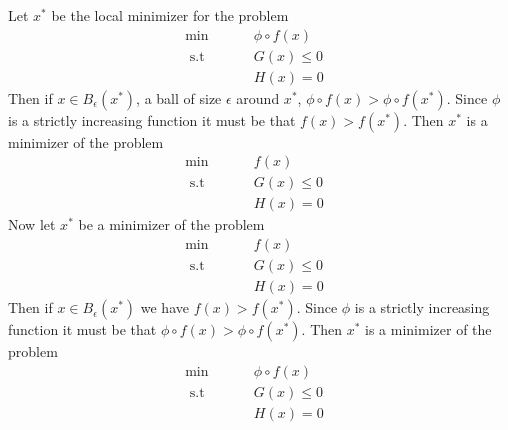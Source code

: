\documentclass[12pt]{article}
\newenvironment{problem}[2][Problem]{\begin{trivlist}
\item[\hskip \labelsep {\bfseries #1}\hskip \labelsep {\bfseries #2}]}{\end{trivlist}}
\begin{document}
\begin{problem}{21.} 
Let $x^*$ be the local minimizer for the problem
\begin{align*}
\min \hspace{1cm} & \phi \circ f(x) &\\
 \text{ s.t } \hspace{1cm}  & G(x) \leq 0& \\
&H(x) = 0&
\end{align*}
Then if $x \in B_\epsilon(x^*)$, a ball of size $\epsilon$ around $x^*$, $ \phi \circ f(x) >  \phi \circ f(x^*)$. Since $\phi$ is a strictly increasing function it must be that $f(x) >  f(x^*)$. Then $x^*$ is a minimizer of the problem
\begin{align*}
\min \hspace{1cm} & f(x) &\\
 \text{ s.t } \hspace{1cm}  & G(x) \leq 0& \\
&H(x) = 0&
\end{align*}
Now let $x^*$ be a minimizer of the problem
\begin{align*}
\min \hspace{1cm} & f(x) &\\
 \text{ s.t } \hspace{1cm}  & G(x) \leq 0& \\
&H(x) = 0&
\end{align*}
Then if $x \in B_\epsilon(x^*)$ we have $ f(x) >  f(x^*)$. Since $\phi$ is a strictly increasing function it must be that $ \phi \circ f(x) >  \phi \circ f(x^*)$. Then $x^*$ is a minimizer of the problem
\begin{align*}
\min \hspace{1cm} & \phi \circ f(x) &\\
 \text{ s.t } \hspace{1cm}  & G(x) \leq 0& \\
&H(x) = 0&
\end{align*}
\end{problem}
\end{document}
